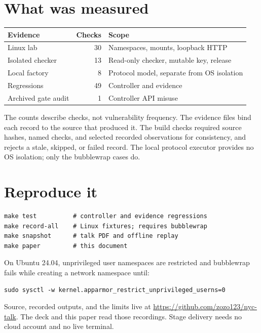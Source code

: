 \documentclass[11pt]{article}
\begin{document}
\section{What was measured}

\begin{center}
\begin{tabular}{@{}lrp{}@{}}
\toprule
Evidence & Checks & Scope \\
\midrule
Linux lab & 30 & Namespaces, mounts, loopback HTTP \\
Isolated checker & 13 & Read-only checker, mutable key, release \\
Local factory & 8 & Protocol model, separate from OS isolation \\
Regressions & 49 & Controller and evidence \\
Archived gate audit & 1 & Controller API misuse \\
\bottomrule
\end{tabular}
\end{center}

The counts describe checks, not vulnerability frequency. The evidence files bind each record to the source that produced it. The build checks required source hashes, named checks, and selected recorded observations for consistency, and rejects a stale, skipped, or failed record. The local protocol executor provides no OS isolation; only the bubblewrap cases do.

\section{Reproduce it}

\begin{lstlisting}
make test          # controller and evidence regressions
make record-all    # Linux fixtures; requires bubblewrap
make snapshot      # talk PDF and offline replay
make paper         # this document
\end{lstlisting}

On Ubuntu 24.04, unprivileged user namespaces are restricted and bubblewrap fails while creating a network namespace until:

\begin{lstlisting}
sudo sysctl -w kernel.apparmor_restrict_unprivileged_userns=0
\end{lstlisting}

Source, recorded outputs, and the limits live at \url{https://github.com/zozo123/nyc-talk}. The deck and this paper read those recordings. Stage delivery needs no cloud account and no live terminal.
\end{document}
